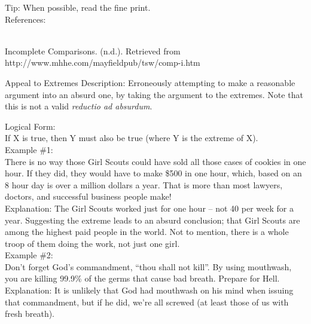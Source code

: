 \documentclass[a4paper,12pt,single,pdftex]{scrartcl}
\begin{document}
    
      Tip: When possible, read the fine print.
    \\

    References:

    
      
        
      \\

      
        
          Incomplete Comparisons. (n.d.). Retrieved from http://www.mhhe.com/mayfieldpub/tsw/comp-i.htm
        
      
    
  

Appeal to Extremes
    Description: Erroneously attempting to make a reasonable argument into an absurd one, by taking the argument to the extremes. Note that this is not a valid {\it reductio ad absurdum}.

    
      Logical Form:
    \\

    
      If X is true, then Y must also be true (where Y is the extreme of X).
    \\

    
      Example \#1:
    \\

    
      There is no way those Girl Scouts could have sold all those cases of cookies in one hour.  If they did, they would have to make \$500 in one hour, which, based on an 8 hour day is over a million dollars a year.  That is more than most lawyers, doctors, and successful business people make!
    \\

    
      Explanation: The Girl Scouts worked just for one hour -- not 40 per week for a year.  Suggesting the extreme leads to an absurd conclusion; that Girl Scouts are among the highest paid people in the world.   Not to mention, there is a whole troop of them doing the work, not just one girl.
    \\

    
      Example \#2:
    \\

    
      Don’t forget God’s commandment, “thou shall not kill”.  By using mouthwash, you are killing 99.9\% of the germs that cause bad breath.  Prepare for Hell.
    \\

    
      Explanation: It is unlikely that God had mouthwash on his mind when issuing that commandment, but if he did, we’re all screwed (at least those of us with fresh breath).
    \\
\end{document}
